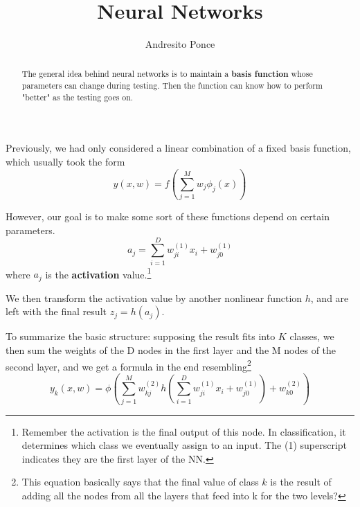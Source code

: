 \documentclass{tufte-handout}
\title{Neural Networks}
\author{Andresito Ponce}
\begin{document}
\maketitle

\begin{abstract}
	The general idea behind neural networks is to 
	maintain a \textbf{basis function} whose parameters
	can change during testing. Then the function can know 
	how to perform "better" as the testing goes on.
\end{abstract}

Previously, we had only considered a linear combination of a fixed
basis function, which usually took the form
\[ y(x, w) = f(\sum_{j=1}^{M}w_{j}\phi_{j}(x))\]

However, our goal is to make some sort of these functions depend on
certain parameters.
\[ a_{j} = \sum_{i=1}^{D}w^{(1)}_{ji}x_{i} + w^{(1)}_{j0}\]
where $a_{j}$ is the \textbf{activation} value.\footnote{Remember the
activation is the final output of this node. In classification, it 
determines which class we eventually assign to an input. The (1) 
superscript indicates they are the first layer of the NN.}

We then transform the activation value by another nonlinear function
$h$, and are left with the final result $z_{j} = h(a_{j})$. 

To summarize the basic structure: supposing the result fits into 
$K$ classes, we then sum the weights of the D nodes in the first
layer and the M nodes of the second layer, and we get a formula 
in the end resembling\footnote{This equation basically says that
the final value of class $k$ is the result of adding all the nodes
from all the layers that feed into k for the two levels?}
\[ y_{k}(x, w) = \phi(\sum_{j=1}^{M}w_{kj}^{(2)}h(\sum_{i=1}^{D}
w_{ji}^{(1)}x_{i}+w_{j0}^{(1)})+w_{k0}^{(2)})\]
\end{document}
